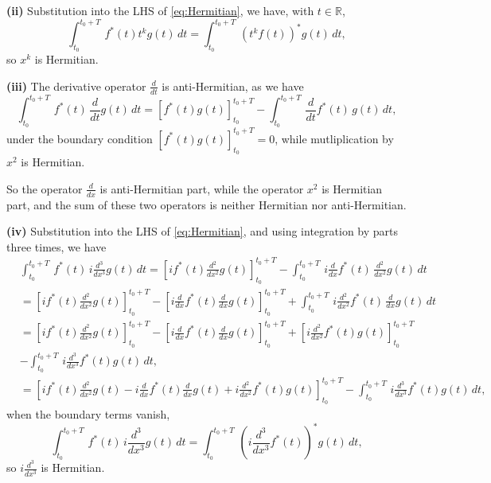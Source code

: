 \documentclass[12pt]{article}
\begin{document}
\smallbreak
\smallbreak

\textbf{(ii)} \quad Substitution into the LHS of \eqref{eq:Hermitian}, we have, with $t \in \mathbb{R}$,
\begin{equation}
    \int_{t_0}^{t_0+T}\, f^*(t) t^k g(t) \,dt = \int_{t_0}^{t_0+T}\, (t^k f(t))^* g(t) \,dt,
\end{equation}
so $x^k$ is Hermitian.

\smallbreak
\smallbreak
\textbf{(iii)} \quad The derivative operator $\frac{d}{dt}$ is anti-Hermitian, as we have
\begin{equation}
   \int_{t_0}^{t_0+T} \, f^*(t) \, \frac{d}{dt} g(t) \, dt = \left[ f^*(t) g(t) \right]_{t_0}^{t_0+T} - \int_{t_0}^{t_0+T} \, \frac{d}{dt} f^*(t) \, g(t) \, dt,
\end{equation} 
under the boundary condition $\left[ f^*(t) g(t) \right]_{t_0}^{t_0+T} = 0$, while mutliplication by $x^2$ is Hermitian.

So the operator $\frac{d}{dx}$ is anti-Hermitian part, while the operator $x^2$ is Hermitian part, and the sum of these two operators is neither Hermitian nor anti-Hermitian.

\smallbreak
\smallbreak
\textbf{(iv)} \quad Substitution into the LHS of \eqref{eq:Hermitian}, and using integration by parts three times, we have
\begin{equation}
\begin{aligned}
    &\int_{t_0}^{t_0+T} \, f^*(t)\,i\frac{d^3}{dx^3} g(t) \, dt = \left[i f^*(t) \frac{d^2}{dx^2} g(t)\right]_{t_0}^{t_0+T} - \int_{t_0}^{t_0+T} \, i \frac{d}{dx} f^*(t) \, \frac{d^2}{dx^2} g(t) \, dt \\
    &= \left[i f^*(t) \frac{d^2}{dx^2} g(t)\right]_{t_0}^{t_0+T} - \left[i \frac{d}{dx} f^*(t) \frac{d}{dx} g(t)\right]_{t_0}^{t_0+T} + \int_{t_0}^{t_0+T} \, i \frac{d^2}{dx^2} f^*(t) \, \frac{d}{dx} g(t) \, dt\\
    &= \left[i f^*(t) \frac{d^2}{dx^2} g(t)\right]_{t_0}^{t_0+T} - \left[i \frac{d}{dx} f^*(t) \frac{d}{dx} g(t)\right]_{t_0}^{t_0+T} + \left[i \frac{d^2}{dx^2} f^*(t) g(t)\right]_{t_0}^{t_0+T} \\&- \int_{t_0}^{t_0+T} \, i \frac{d^3}{dx^3} f^*(t) g(t) \, dt,\\
    &= \left[i f^*(t) \frac{d^2}{dx^2} g(t) - i \frac{d}{dx} f^*(t) \frac{d}{dx} g(t) + i \frac{d^2}{dx^2} f^*(t) g(t)\right]_{t_0}^{t_0+T} - \int_{t_0}^{t_0+T} \, i \frac{d^3}{dx^3} f^*(t) g(t) \, dt,
\end{aligned}
\end{equation}
when the boundary terms vanish,
\begin{equation}
    \int_{t_0}^{t_0+T} \, f^*(t)\,i\frac{d^3}{dx^3} g(t) \, dt = \int_{t_0}^{t_0+T} \, \left( i \frac{d^3}{dx^3} f^*(t) \right)^* g(t) \, dt,
\end{equation}
so $i \frac{d^3}{dx^3}$ is Hermitian.
\end{document}
